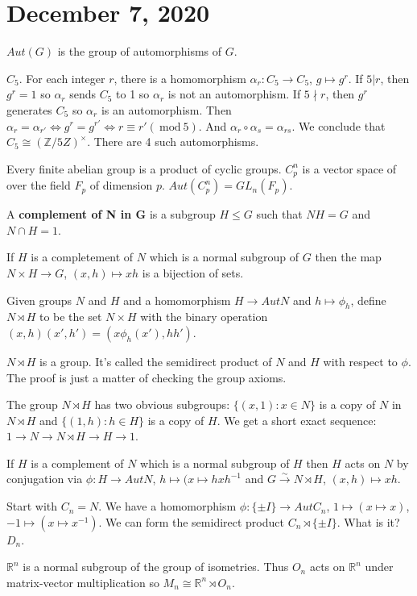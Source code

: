 \documentclass{article}
\newcommand{\vocab}[1]{\textbf{\color{blue!90}\boldmath #1}}
\newcommand{\R}{\mathbb{R}}
\newcommand{\Z}{\mathbb{Z}}
\newcommand{\notdiv}{\nmid}
\renewcommand{\mod}[1]{\ \text{mod}\ #1}
\newcommand{\ra}[1][]{\xrightarrow{#1}}
\begin{document}
\section{December 7, 2020}
\begin{definition}
$Aut(G)$ is the group of automorphisms of $G$.
\end{definition}
\begin{example}
$C_5$. For each integer $r$, there is a homomorphism $\alpha_r:C_5\ra C_5$, $g\mapsto g^r$. If $5|r$, then $g^r=1$ so $\alpha_r$ sends $C_5$ to 1 so $\alpha_r$ is not an automorphism. If $5\notdiv r$, then $g^r$ generates $C_5$ so $\alpha_r$ is an automorphism. Then $\alpha_r=\alpha_{r'}\iff g^r=g^{r'}\iff r\equiv r'(\mod{5})$. And $\alpha_r\circ \alpha_s=\alpha_{rs}$. We conclude that $C_5\cong (\Z/5Z)^\times$. There are 4 such automorphisms.
\end{example}
\begin{example}
Every finite abelian group is a product of cyclic groups. $C_p^n$ is a vector space of over the field $F_p$ of dimension $p$. $Aut(C_p^n)=GL_n(F_p)$.
\end{example}
\begin{definition}
A \vocab{complement of N in G} is a subgroup $H\leq G$ such that $NH=G$ and $N\cap H=1$.
\end{definition}
\begin{proposition}
If $H$ is a completement of $N$ which is a normal subgroup of $G$ then the map $N\times H\ra G$, $(x,h)\mapsto xh$ is a bijection of sets.
\end{proposition}
\begin{definition}
Given groups $N$ and $H$ and a homomorphism $H\ra Aut N$ and $h\mapsto \phi_h$, define $N\rtimes H$ to be the set $N\times H$ with the binary operation $(x,h)(x',h')=(x\phi_h(x'),hh')$.
\end{definition}
\begin{proposition}
$N\rtimes H$ is a group. It's called the semidirect product of $N$ and $H$ with respect to $\phi$. The proof is just a matter of checking the group axioms.
\end{proposition}
The group $N\rtimes H$ has two obvious subgroups: $\{(x,1):x\in N\}$ is a copy of $N$ in $N\rtimes H$ and $\{(1,h):h\in H\}$ is a copy of $H$. We get a short exact sequence: $1\ra N\ra N\rtimes H\ra H\ra 1$.
\begin{proposition}
If $H$ is a complement of $N$ which is a normal subgroup of $H$ then $H$ acts on $N$ by conjugation via $\phi:H\ra Aut N$, $h\mapsto (x\mapsto hxh^{-1}$ and $G\ra[\sim]N\rtimes H$, $(x,h)\mapsto xh$.
\end{proposition}
\begin{example}
Start with $C_n=N$. We have a homomorphism $\phi:\{\pm I\}\ra Aut C_n$, $1\mapsto (x\mapsto x)$, $-1\mapsto (x\mapsto x^{-1})$. We can form the semidirect product $C_n\rtimes \{\pm I\}$. What is it? $D_n$.
\end{example}
\begin{example}
$\R^n$ is a normal subgroup of the group of isometries. Thus $O_n$ acts on $\R^n$ under matrix-vector multiplication so $M_n\cong \R^n\rtimes O_n$.
\end{example}
\end{document}

